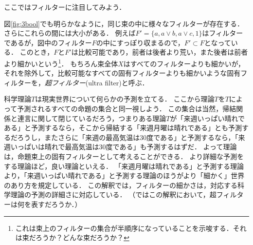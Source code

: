 \documentclass[11pt,a4paper, dvipdfmx]{jsarticle}
\begin{document}

ここではフィルターに注目してみよう．


図\ref{fig:3bool}でも明らかなように，同じ束の中に様々なフィルターが存在する．
さらにこれらの間には大小がある．
例えば$F' = \{a, a\vee b, a \vee c, 1\}$はフィルターであるが，図中のフィルター$F$の中にすっぽり収まるので，$F' \subset F$となっている．
このとき，$F$と$F'$は比較可能であり，前者は後者より荒い，また後者は前者より細かいという\footnote{これは束上のフィルターの集合が半順序になっていることを示唆する．それは束だろうか？どんな束だろうか？}．
もちろん束全体$X$はすべてのフィルターよりも細かいが，それを除外して，比較可能なすべての固有フィルターよりも細かいような固有フィルターを，\emph{超フィルター}(ultra filter)と呼ぶ．

\begin{example}[科学理論と予測の詳細さ]\label{ex:theory}
科学理論$T$は現実世界について何らかの予測を立てる．
ここから理論$T$を$T$によって予測されるすべての命題の集合と同一視しよう．
この集合は当然，帰結関係と連言に関して閉じているだろう，つまりある理論$T$が「来週いっぱい晴れである」と予測するなら，そこから帰結する「来週月曜は晴れである」とも予測するだろうし，またさらに「来週の最高気温は30度である」と予測するなら，「来週いっぱいは晴れで最高気温は30度である」も予測するはずだ．
よって理論は，命題束上の固有フィルターとして考えることができる．
より詳細な予測をする理論ほど，良い理論といえる．
「来週月曜は晴れである」と予測する理論より，「来週いっぱい晴れである」と予測する理論のほうがより「細かく」世界のあり方を規定している．
この解釈では，フィルターの細かさは，対応する科学理論の予測の詳細さに対応している．
（ではこの解釈において，超フィルターは何を表すだろうか．）
\end{example}
\end{document}
